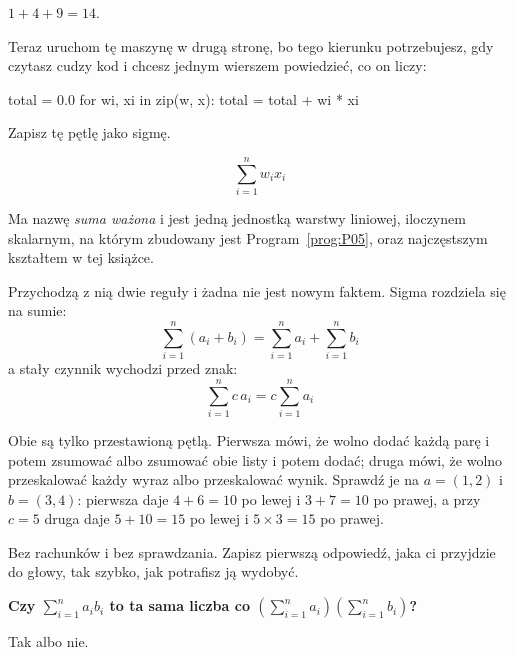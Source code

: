 \begin{fr}
\begin{ansblock}
$1 + 4 + 9 = 14$.
\end{ansblock}

Teraz uruchom tę maszynę w drugą stronę, bo tego kierunku potrzebujesz, gdy
czytasz cudzy kod i chcesz jednym wierszem powiedzieć, co on liczy:

\begin{python}
total = 0.0
for wi, xi in zip(w, x):
    total = total + wi * xi
\end{python}

Zapisz tę pętlę jako sigmę.
\nextframe
\end{fr}

\begin{fr}
\begin{ansblock}
\[ \sum_{i=1}^{n} w_i x_i \]
\end{ansblock}

Ma nazwę \dash{} \emph{suma ważona} \dash{} i jest jedną jednostką warstwy
liniowej, iloczynem skalarnym, na którym zbudowany jest
Program~\ref{prog:P05}, oraz najczęstszym kształtem w tej książce.

Przychodzą z nią dwie reguły i żadna nie jest nowym faktem. Sigma rozdziela
się na sumie:
\[ \sum_{i=1}^{n} (a_i + b_i) = \sum_{i=1}^{n} a_i + \sum_{i=1}^{n} b_i \]
a stały czynnik wychodzi przed znak:
\[ \sum_{i=1}^{n} c\,a_i = c \sum_{i=1}^{n} a_i \]

Obie są tylko przestawioną pętlą. Pierwsza mówi, że wolno dodać każdą parę i
potem zsumować albo zsumować obie listy i potem dodać; druga mówi, że wolno
przeskalować każdy wyraz albo przeskalować wynik. Sprawdź je na $a = (1, 2)$ i
$b = (3, 4)$: pierwsza daje $4 + 6 = 10$ po lewej i $3 + 7 = 10$ po prawej, a
przy $c = 5$ druga daje $5 + 10 = 15$ po lewej i $5 \times 3 = 15$ po
prawej.
\end{fr}

\begin{fr}
Bez rachunków i bez sprawdzania. Zapisz pierwszą odpowiedź, jaka ci przyjdzie
do głowy, tak szybko, jak potrafisz ją wydobyć.

\textbf{Czy $\sum_{i=1}^{n} a_i b_i$ to ta sama liczba co
$\left(\sum_{i=1}^{n} a_i\right)\left(\sum_{i=1}^{n} b_i\right)$?}

Tak albo nie.
\dotline
\nextframe
\end{fr}

